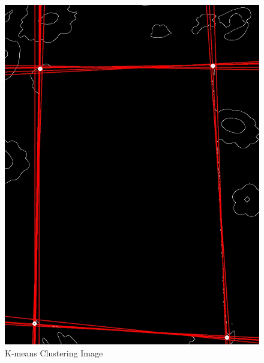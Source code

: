 \begin{enumerate}
    \begin{figure}[h]
        \centering
        \begin{minipage}[b]{0.30\linewidth}
            \includegraphics[width=\linewidth]{output/grouped.jpg}
            \caption{K-means Clustering Image}
        \end{minipage}
        \hspace{3cm}
        \begin{minipage}[b]{0.30\linewidth}

\end{minipage}
\end{figure}
\end{enumerate}

